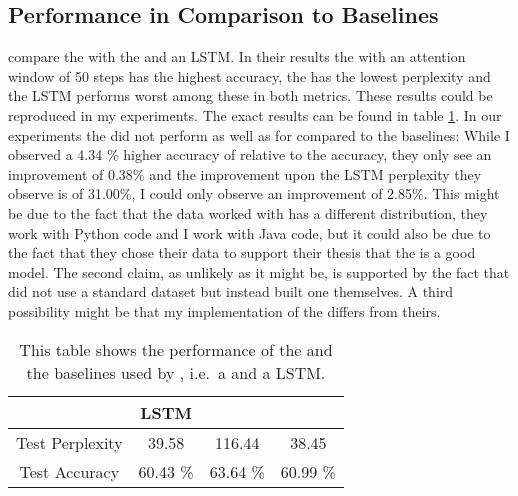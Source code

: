 \documentclass[11pt]{article}
\begin{document}
\subsection{\spn Performance in Comparison to Baselines}
\cite{bhoopchand2016learning} compare the \spn with the \lmatt and an LSTM. In their results the \lmatt with an attention window of 50 steps has the highest accuracy, the \spn has the lowest perplexity and the LSTM performs worst among these in both metrics. These results could be reproduced in my experiments. The exact results can be found in table \ref{spn_perf}. In our experiments the \spn did not perform as well as for \cite{bhoopchand2016learning} compared to the baselines: While I observed a 4.34 \% higher accuracy of \lmatt relative to the \spn{} accuracy, they only see an improvement of 0.38\% and the improvement upon the LSTM perplexity they observe is of 31.00\%, I could only observe an improvement of 2.85\%. This might be due to the fact that the data worked with has a different distribution, they work with Python code and I work with Java code, but it could also be due to the fact that they chose their data to support their thesis that the \spn is a good model. The second claim, as unlikely as it might be, is supported by the fact that \cite{bhoopchand2016learning} did not use a standard dataset but instead built one themselves. A third possibility might be that my implementation of the \spn differs from theirs.
\begin{table}
\centering
	\begin{tabular}{c | c | c | c}
		  & LSTM & \lmatt & \spn\\\hline
		Test Perplexity & 39.58 & 116.44 & 38.45	\\\hline
		Test Accuracy & 60.43 \% & 63.64 \% & 60.99 \%
	\end{tabular}
\label{spn_perf}
\caption{This table shows the performance of the \spn and the baselines used by \cite{bhoopchand2016learning}, i.e.\ a \lmatt and a LSTM.}
\end{table}
\end{document}
